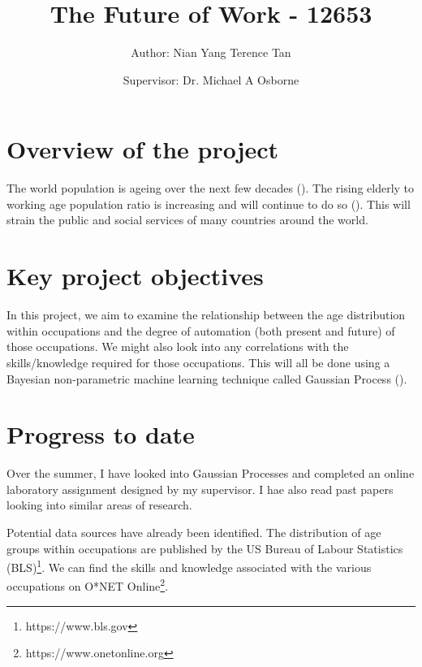 \documentclass[11pt]{article}
\title{The Future of Work - 12653}
\author{Author: Nian Yang Terence Tan \and Supervisor: Dr. Michael A Osborne}
\begin{document}
\maketitle


\section{Overview of the project}
The world population is ageing over the next few decades (\cite{science}). The rising elderly to working age population ratio is increasing and will continue to do so (\cite{WHO}). This will strain the public and social services of many countries around the world. 

\section{Key project objectives}
In this project, we aim to examine the relationship between the age distribution within occupations and the degree of automation (both present and future) of those occupations. We might also look into any correlations with the skills/knowledge required for those occupations. This will all be done using a Bayesian non-parametric machine learning technique called Gaussian Process (\cite{GaussianProcess}).

  
\section{Progress to date}
Over the summer, I have looked into Gaussian Processes and completed an online laboratory assignment designed by my supervisor. I hae also read past papers looking into similar areas of research.

Potential data sources have already been identified. The distribution of age groups within occupations are published by the US Bureau of Labour Statistics (BLS)\footnote{https://www.bls.gov}. We can find the skills and knowledge associated with the various occupations on O*NET Online\footnote{https://www.onetonline.org}.
\end{document}
